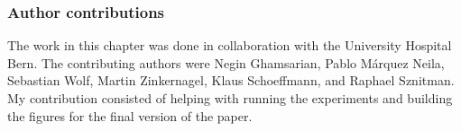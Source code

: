 \subsubsection{Author contributions}The work in this chapter was done in collaboration with the University Hospital Bern. The contributing authors were Negin Ghamsarian, Pablo Márquez Neila, Sebastian Wolf, Martin Zinkernagel, Klaus Schoeffmann, and Raphael Sznitman. My contribution consisted of helping with running the experiments and building the figures for the final version of the paper.





